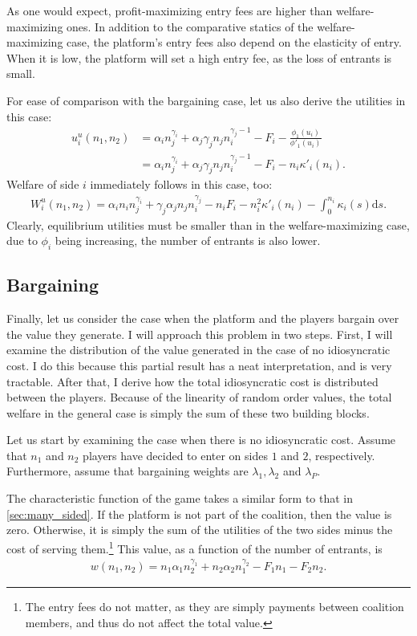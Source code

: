 \documentclass[a4paper]{article}
\newcommand{\ds}{\mathrm{d}s}
\begin{document}
As one would expect, profit-maximizing entry fees are higher than welfare-maximizing ones.
In addition to the comparative statics of the welfare-maximizing case, the platform's entry fees also depend on the elasticity of entry.
When it is low, the platform will set a high entry fee, as the loss of entrants is small.

For ease of comparison with the bargaining case, let us also derive the utilities in this case:
\begin{align*}
    u_i^u(n_1, n_2) &= \alpha_i n_j ^ {\gamma_i} + \alpha_j \gamma_j n_j n_i^{\gamma_j - 1} - F_i - \frac{\phi_1(u_i)}{\phi'_1(u_i)} \\
    &= \alpha_i n_j ^ {\gamma_i} + \alpha_j \gamma_j n_j n_i^{\gamma_j - 1} - F_i - n_i \kappa'_i(n_i).
\end{align*}
Welfare of side $i$ immediately follows in this case, too:
\begin{align*}
    \label{eq:W_u}
    W_i^u(n_1, n_2) = \alpha_i n_i n_j ^ {\gamma_i} + \gamma_j \alpha_j n_j n_i^{\gamma_j} - n_i F_i - n_i^2 \kappa'_i(n_i) - \int_0^{n_i} \kappa_i(s) \ds.
\end{align*}
Clearly, equilibrium utilities must be smaller than in the welfare-maximizing case, due to $\phi_i$ being increasing, the number of entrants is also lower.

\subsection{Bargaining}

Finally, let us consider the case when the platform and the players bargain over the value they generate.
I will approach this problem in two steps.
First, I will examine the distribution of the value generated in the case of no idiosyncratic cost.
I do this because this partial result has a neat interpretation, and is very tractable.
After that, I derive how the total idiosyncratic cost is distributed between the players.
Because of the linearity of random order values, the total welfare in the general case is simply the sum of these two building blocks.

Let us start by examining the case when there is no idiosyncratic cost.
Assume that $n_1$ and $n_2$ players have decided to enter on sides $1$ and $2$, respectively.
Furthermore, assume that bargaining weights are $\lambda_1, \lambda_2$ and $\lambda_P$.

The characteristic function of the game takes a similar form to that in \cref{sec:many_sided}.
If the platform is not part of the coalition, then the value is zero.
Otherwise, it is simply the sum of the utilities of the two sides minus the cost of serving them.\footnote{
    The entry fees do not matter, as they are simply payments between coalition members, and thus do not affect the total value.
}
This value, as a function of the number of entrants, is
\begin{align*}
    w(n_1, n_2) = n_1 \alpha_1 n_2^{\gamma_1} + n_2 \alpha_2 n_1^{\gamma_2} - F_1 n_1 - F_2 n_2.
\end{align*}
\end{document}
